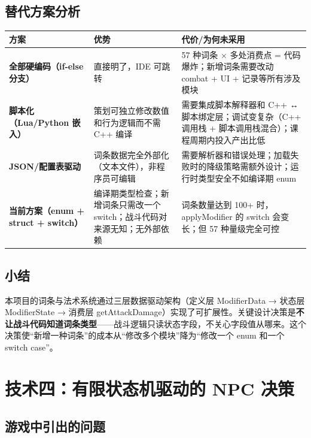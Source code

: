 \documentclass[utf8]{ctexart}
\begin{document}
\subsection{替代方案分析}

\begin{longtable}{p{}p{}p{}}
\toprule
\textbf{方案} & \textbf{优势} & \textbf{代价/为何未采用} \\
\midrule
\textbf{全部硬编码（if-else 分支）} & 直接明了，IDE 可跳转 & 57 种词条 × 多处消费点 = 代码爆炸；新增词条需要改动 combat + UI + 记录等所有涉及模块 \\
\hline
\textbf{脚本化（Lua/Python 嵌入）} & 策划可独立修改数值和行为逻辑而不需 C++ 编译 & 需要集成脚本解释器和 C++ ↔ 脚本绑定层；调试变复杂（C++ 调用栈 + 脚本调用栈混合）；课程周期内投入产出比低 \\
\hline
\textbf{JSON/配置表驱动} & 词条数据完全外部化（文本文件），非程序员可编辑 & 需要解析器和错误处理；加载失败时的降级策略需额外设计；运行时类型安全不如编译期 enum \\
\hline
\textbf{当前方案（enum + struct + switch）} & 编译期类型检查；新增词条只需改一个 switch；战斗代码对来源无知；无外部依赖 & 词条数量达到 100+ 时，applyModifier 的 switch 会变长；但 57 种量级完全可控 \\
\bottomrule
\end{longtable}

\subsection{小结}

本项目的词条与法术系统通过三层数据驱动架构（定义层 ModifierData → 状态层 ModifierState → 消费层 getAttackDamage）实现了可扩展性。关键设计决策是\textbf{不让战斗代码知道词条类型}——战斗逻辑只读状态字段，不关心字段值从哪来。这个决策使“新增一种词条”的成本从“修改多个模块”降为“修改一个 enum 和一个 switch case”。

\newpage

\section{技术四：有限状态机驱动的 NPC 决策}

\subsection{游戏中引出的问题}
\end{document}
